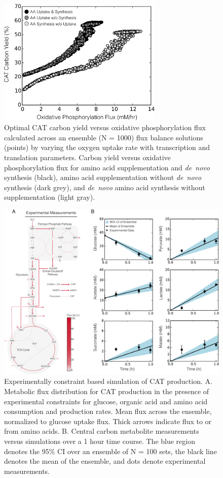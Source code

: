 \documentclass[journal=asbcd6,manuscript=article]{achemso}
\begin{document}
\clearpage

\begin{figure}[t!]
\includegraphics[width=0.7\textwidth]{./figs/Fig-4-OxyPhox-versus-Carbon-Yield.pdf}
\caption{Optimal CAT carbon yield versus oxidative phosphorylation flux calculated across an ensemble (N = 1000) flux balance solutions (points) by varying the oxygen uptake rate with transcription and translation parameters.
Carbon yield versus oxidative phosphorylation flux for amino acid supplementation and \textit{de~novo} synthesis (black),
amino acid supplementation without \textit{de~novo} synthesis (dark grey),
and \textit{de~novo} amino acid synthesis without supplementation (light gray).}
\label{fig:oxphos_yield}
\end{figure}


\clearpage

\begin{figure}[t!]
\includegraphics[width=1.00\textwidth]{./figs/Fig-6-FluxDistribition-Experimental.pdf}
\caption{Experimentally constraint based simulation of CAT production.
A. Metabolic flux distribution for CAT production in the presence of experimental constraints for glucose, organic acid and amino acid consumption and production rates.
Mean flux across the ensemble, normalized to glucose uptake flux. Thick arrows indicate flux to or from amino acids.
B. Central carbon metabolite measurements versus simulations over a 1 hour time course.
The blue region denotes the 95\% CI over an ensemble of N = 100 sets, the black line denotes the mean of the ensemble, and dots denote experimental measurements.}
\label{fig:flux_exp}
\end{figure}
\end{document}
